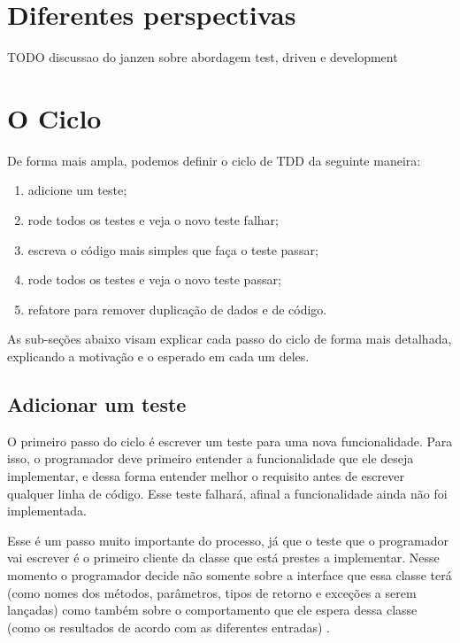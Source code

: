 \section{Diferentes perspectivas}

TODO discussao do janzen sobre abordagem test, driven e development 

\section{O Ciclo} 
\label{sec:tdd-ciclo}

De forma mais ampla, podemos definir o ciclo de TDD da seguinte maneira:

\begin{enumerate}
	\item adicione um teste; 
	\item rode todos os testes e veja o novo teste falhar; 
	\item escreva o código mais simples que faça o teste passar; 
	\item rode todos os testes e veja o novo teste passar; 
	\item refatore para remover duplicação de dados e de código.
\end{enumerate}

As sub-seções abaixo visam explicar cada passo do ciclo de forma mais detalhada, explicando a motivação e o esperado 
em cada um deles.

\subsection{Adicionar um teste}

O primeiro passo do ciclo é escrever um teste para uma nova funcionalidade. Para isso, o programador deve primeiro entender a funcionalidade 
que ele deseja implementar, e dessa forma entender melhor o requisito antes de escrever qualquer linha de código.
Esse teste falhará, afinal a funcionalidade ainda não foi implementada. 

Esse é um passo muito importante do processo, já que o teste que o programador vai escrever é o primeiro cliente da classe que está
prestes a implementar. Nesse momento o programador decide não somente sobre a interface que essa classe terá (como nomes dos métodos,
parâmetros, tipos de retorno e exceções a serem lançadas) como também sobre o comportamento que ele espera dessa classe (como 
os resultados de acordo com as diferentes entradas) \cite{GOOS}.


